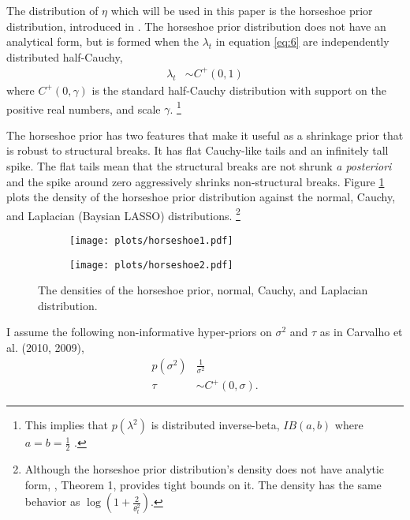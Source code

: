\documentclass{article}
\begin{document}
The distribution of $\eta$ which will be used in this paper is the horseshoe prior distribution, introduced in \textcites{CarvalhoPolsonScott2009}{CarvalhoPolsonScott2010}.
The horseshoe prior distribution does not have an analytical form, but is formed when the $\lambda_{t}$ in equation \eqref{eq:6} are independently distributed half-Cauchy,
\begin{align}
  \label{eq:13}
  \lambda_{t} &\sim C^{+}(0, 1)
\end{align}
where $C^{+}(0, \gamma)$ is the standard half-Cauchy distribution with support on the positive real numbers, and scale $\gamma$.%
\footnote{
  This implies that $p(\lambda^{2})$ is distributed inverse-beta, $IB(a, b)$ where $a = b = \frac{1}{2}$ \parencite[4]{PolsonScott2010}. 
}

The horseshoe prior has two features that make it useful as a shrinkage prior that is robust to structural breaks.
It has flat Cauchy-like tails and an infinitely tall spike.
The flat tails mean that the structural breaks are not shrunk \textit{a posteriori} and the spike around zero aggressively shrinks non-structural breaks.
Figure \ref{fig:horseshoe} plots the density of the horseshoe prior distribution against the normal, Cauchy, and Laplacian (Baysian LASSO) distributions.%
\footnote{
  Although the horseshoe prior distribution's density does not have analytic form, \textcite{CarvalhoPolsonScott2010}, Theorem 1, provides tight bounds on it.
  The density has the same behavior as $\log (1 + \frac{2}{\theta_{t}^{2}})$.
}

\begin{figure}
  \centering
  \begin{subfigure}[b]{0.5\textwidth}
    \texttt{[image: plots/horseshoe1.pdf]}
  \end{subfigure}%
  \begin{subfigure}[b]{0.5\textwidth}
    \texttt{[image: plots/horseshoe2.pdf]}
  \end{subfigure}
  \caption{The densities of the horseshoe prior, normal, Cauchy, and Laplacian distribution.}
  \label{fig:horseshoe}
\end{figure}

I assume the following non-informative hyper-priors on $\sigma^{2}$ and $\tau$ as in Carvalho et al. (2010, 2009),
\begin{align}
  \label{eq:9}
  p(\sigma^{2}) & \frac{1}{\sigma^{2}}  \\
  \label{eq:11}
  \tau &\sim C^{+}(0, \sigma) \text{.}
\end{align}
\end{document}
